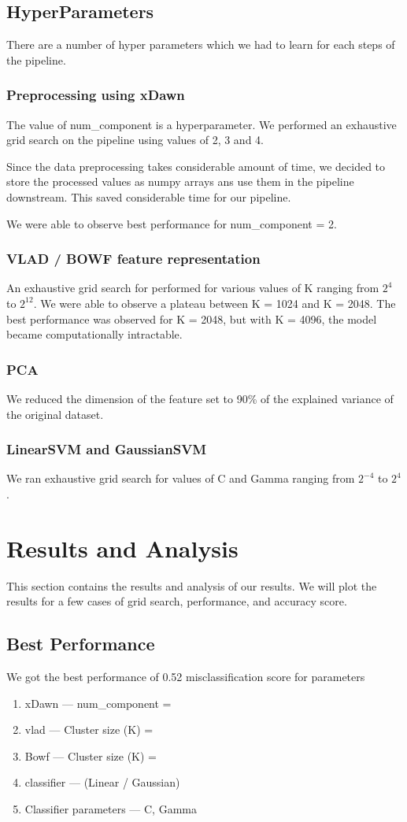 \documentclass[final,leqno,onefignum,onetabnum]{siamltexmm}
\begin{document}
\subsection{HyperParameters}
There are a number of hyper parameters which we had to learn for each steps of the pipeline.
\subsubsection{Preprocessing using xDawn}
The value of num\_component is a hyperparameter.  We performed an exhaustive grid search on the pipeline using values of 2, 3 and 4.

Since the data preprocessing takes considerable amount of time, we decided to store the processed values as numpy arrays ans use them in the pipeline downstream.  This saved considerable time for our pipeline.

We were able to observe best performance for num\_component = 2.


\subsubsection{VLAD / BOWF feature representation}
An exhaustive grid search for performed for various values of K ranging from $2^{4}$ to $2^{12}$.
We were able to observe a plateau between K = 1024 and K = 2048.  The best performance was observed for K = 2048, but with K = 4096, the model became computationally intractable.

\subsubsection{PCA}
We reduced the dimension of the feature set to 90\% of the explained variance of the original dataset.

\subsubsection{LinearSVM and GaussianSVM}
We ran exhaustive grid search for values of C and Gamma ranging from $2^{-4}$ to $2^{4}$.

\section{Results and Analysis}
This section contains the results and analysis of our results.  We will plot the results for a few cases of grid search, performance, and accuracy score.
\subsection{Best Performance}
We got the best performance of 0.52 misclassification score for parameters
\begin{enumerate}
  \item  xDawn --- num\_component = 
  \item  vlad --- Cluster size (K) = 
  \item  Bowf --- Cluster size (K) = 
  \item  classifier --- (Linear / Gaussian)
  \item  Classifier parameters --- C, Gamma
\end{enumerate}
\end{document}
